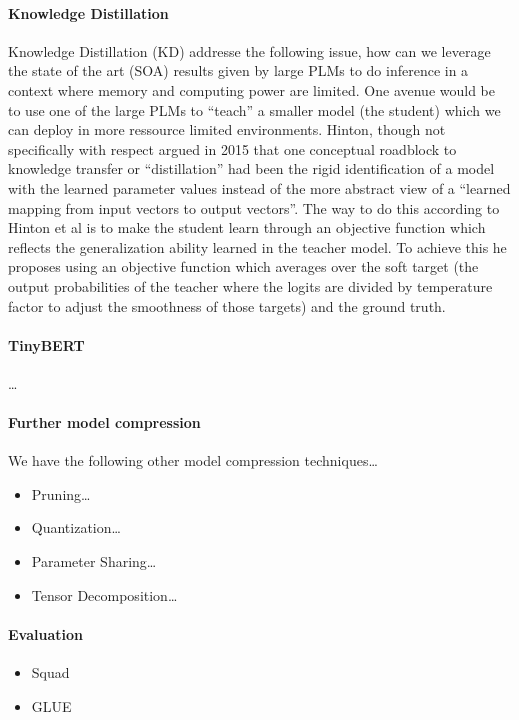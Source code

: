 \message{ !name(projectproposal.tex)}\documentclass{article}
\begin{document}
\paragraph{Knowledge Distillation} Knowledge Distillation (KD) addresse the
following issue, how can we leverage the state of the art (SOA) results given by
large PLMs to do inference in a context where memory and computing power are
limited. One avenue would be to use one of the large PLMs to ``teach'' a smaller
model (the student) which we can deploy in more ressource limited environments.
Hinton, though not specifically with respect argued in
2015\cite{hinton2015distilling} that one conceptual roadblock to knowledge
transfer or ``distillation'' had been the rigid identification of a model with
the learned parameter values instead of the more abstract view of a
\enquote{learned mapping from input vectors to output
vectors}\cite{hinton2015distilling}. The way to do this according to Hinton et
al is to make the student learn through an objective function which reflects the
generalization ability learned in the teacher model. To achieve this he proposes
using an objective function which averages over the soft target (the output
probabilities of the teacher where the logits are divided by temperature factor
to adjust the smoothness of those targets) and the ground truth.\\

\paragraph{TinyBERT}\ldots\cite{tinybert}

\paragraph{Further model compression}
We have the following other model compression techniques\ldots\cite{gupta2020compression}
\begin{itemize}
  \item Pruning\ldots
  \item Quantization\ldots
  \item Parameter Sharing\ldots
  \item Tensor Decomposition\ldots
\end{itemize}


\paragraph{Evaluation}
\begin{itemize}
  \item Squad\cite{squad}
  \item GLUE\cite{glue}
\end{itemize}
\end{document}
